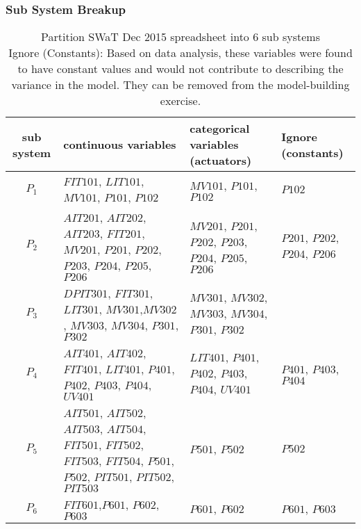 \documentclass{article}
\begin{document}
\subsubsection{Sub System Breakup}
    \begin{table}[!ht]  
            \begin{tabular}{|c|p{4cm}|p{4cm}|p{4cm}|}\hline
            \rowcolor{x11gray}
            \textsf{sub system} & \textsf{continuous variables} &  \textsf{categorical variables (actuators)} & \textsf{Ignore (constants)} \\ \hline            
            $P_1$ &{\small $FIT101$, $LIT101$, $MV101$, $P101$, $P102$} &{\small$MV101$, $P101$, $P102$} & {\small $P102$} \\ \hline
            $P_2$ &{\small $AIT201$, $AIT202$, $AIT203$, $FIT201$, $MV201$, $P201$, $P202$, $P203$, $P204$, $P205$, $P206$} &{\small$MV201$, $P201$, $P202$, $P203$, $P204$, $P205$, $P206$} &{\small$P201$, $P202$, $P204$, $P206$} \\ \hline
            $P_3$ &{\small $DPIT301$, $FIT301$, $LIT301$, $MV301$,$MV302$, $MV303$, $MV304$, $P301$, $P302$} &{\small$MV301$, $MV302$, $MV303$, $MV304$, $P301$, $P302$} & \\ \hline
            $P_4$ &{\small $AIT401$, $AIT402$, $FIT401$, $LIT401$, $P401$, $P402$, $P403$, $P404$, $UV401$} &{\small $LIT401$, $P401$, $P402$, $P403$, $P404$, $UV401$} &{\small$P401$, $P403$, $P404$} \\ \hline
            $P_5$ &{\small$AIT501$, $AIT502$, $AIT503$, $AIT504$, $FIT501$, $FIT502$, $FIT503$, $FIT504$, $P501$, $P502$, $PIT501$, $PIT502$, $PIT503$} &{\small$P501$, $P502$} &{\small $P502$}  \\ \hline
            $P_6$ &{\small $FIT601$,$P601$, $P602$, $P603$} &{\small $P601$, $P602$} &{\small $P601$, $P603$} \\ \hline
            \end{tabular}
        \caption{\textsf{Partition SWaT Dec 2015 spreadsheet into 6 sub systems} \\
            {\small \textsf{Ignore (Constants): Based on data analysis, these variables were found to have constant values and would not contribute to describing the variance in the model. They can be removed from the model-building exercise.}}}   
    \end{table}


\clearpage 
\end{document}
